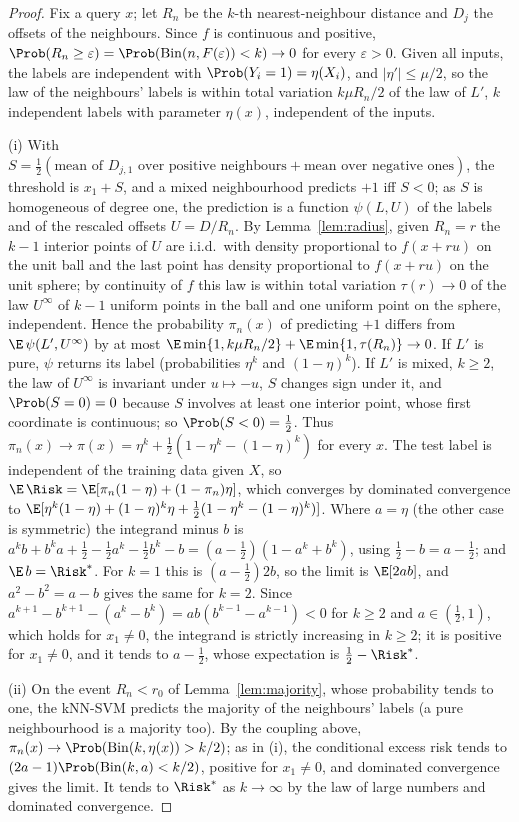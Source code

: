\begin{proof}
Fix a query $x$; let $R_n$ be the $k$-th nearest-neighbour distance and $D_j$ the offsets of the neighbours. Since $f$ is continuous and positive, $\Prob(R_n\ge\varepsilon)=\Prob(\mathrm{Bin}(n,F(\varepsilon))<k)\to0$ for every $\varepsilon>0$. Given all inputs, the labels are independent with $\Prob(Y_i=1)=\eta(X_i)$, and $|\eta'|\le\mu/2$, so the law of the neighbours' labels is within total variation $k\mu R_n/2$ of the law of $L'$, $k$ independent labels with parameter $\eta(x)$, independent of the inputs.

(i) With $S=\tfrac12(\text{mean of }D_{j,1}\text{ over positive neighbours}+\text{mean over negative ones})$, the threshold is $x_1+S$, and a mixed neighbourhood predicts $+1$ iff $S<0$; as $S$ is homogeneous of degree one, the prediction is a function $\psi(L,U)$ of the labels and of the rescaled offsets $U=D/R_n$. By Lemma~\ref{lem:radius}, given $R_n=r$ the $k-1$ interior points of $U$ are i.i.d.\ with density proportional to $f(x+ru)$ on the unit ball and the last point has density proportional to $f(x+ru)$ on the unit sphere; by continuity of $f$ this law is within total variation $\tau(r)\to0$ of the law $U^\infty$ of $k-1$ uniform points in the ball and one uniform point on the sphere, independent. Hence the probability $\pi_n(x)$ of predicting $+1$ differs from $\E\,\psi(L',U^\infty)$ by at most $\E\min\{1,k\mu R_n/2\}+\E\min\{1,\tau(R_n)\}\to0$. If $L'$ is pure, $\psi$ returns its label (probabilities $\eta^k$ and $(1-\eta)^k$). If $L'$ is mixed, $k\ge2$, the law of $U^\infty$ is invariant under $u\mapsto-u$, $S$ changes sign under it, and $\Prob(S=0)=0$ because $S$ involves at least one interior point, whose first coordinate is continuous; so $\Prob(S<0)=\tfrac12$. Thus $\pi_n(x)\to\pi(x)=\eta^k+\tfrac12(1-\eta^k-(1-\eta)^k)$ for every $x$. The test label is independent of the training data given $X$, so $\E\,\Risk=\E[\pi_n(1-\eta)+(1-\pi_n)\eta]$, which converges by dominated convergence to $\E[\eta^k(1-\eta)+(1-\eta)^k\eta+\tfrac12(1-\eta^k-(1-\eta)^k)]$. Where $a=\eta$ (the other case is symmetric) the integrand minus $b$ is $a^kb+b^ka+\tfrac12-\tfrac12a^k-\tfrac12b^k-b=(a-\tfrac12)(1-a^k+b^k)$, using $\tfrac12-b=a-\tfrac12$; and $\E\,b=\Risk^*$. For $k=1$ this is $(a-\tfrac12)2b$, so the limit is $\E[2ab]$, and $a^2-b^2=a-b$ gives the same for $k=2$. Since $a^{k+1}-b^{k+1}-(a^k-b^k)=ab(b^{k-1}-a^{k-1})<0$ for $k\ge2$ and $a\in(\tfrac12,1)$, which holds for $x_1\neq0$, the integrand is strictly increasing in $k\ge2$; it is positive for $x_1\ne0$, and it tends to $a-\tfrac12$, whose expectation is $\tfrac12-\Risk^*$.

(ii) On the event $R_n<r_0$ of Lemma~\ref{lem:majority}, whose probability tends to one, the kNN-SVM predicts the majority of the neighbours' labels (a pure neighbourhood is a majority too). By the coupling above, $\pi_n(x)\to\Prob(\mathrm{Bin}(k,\eta(x))>k/2)$; as in (i), the conditional excess risk tends to $(2a-1)\Prob(\mathrm{Bin}(k,a)<k/2)$, positive for $x_1\neq0$, and dominated convergence gives the limit. It tends to $\Risk^*$ as $k\to\infty$ by the law of large numbers and dominated convergence.
\end{proof}

